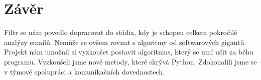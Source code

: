 \documentclass[12pt]{article}
\begin{document}
\section{Závěr}

Filtr se nám povedlo dopracovat do stádia, kdy je schopen celkem pokročilé analýzy emailů. Nemůže se ovšem rovnat s algoritmy od softwarových gigantů. Projekt nám umožnil si vyzkoušet postavit algoritmus, který se umí učit za běhu programu. Vyzkoušeli jsme nové metody, které skrývá Python. Zdokonalili jsme se v týmové spolupráci a komunikačních dovednostech.
\end{document}

